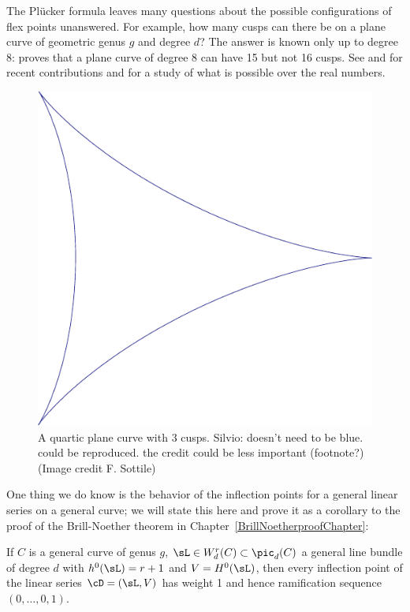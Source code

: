 The Pl\"ucker formula leaves many questions about the possible configurations of flex points unanswered. 
For example, how many cusps can there be on a plane curve of geometric genus $g$ and degree $d$? 
The answer is known only up to degree 8: \cite{Zariski1931} proves that a plane curve of degree 8 can have 15 but not 16 cusps.
See \cite{Calabri} and \cite{Kulikov} for recent contributions and \cite{Kharlamov-Sottile} for a study of what is possible
over the real numbers.

\begin{figure}\label{3-cusp quartic}
\centerline{ \includegraphics[scale=.5]{"main/Fig12-1-threeCusps"}}
 \caption{A quartic plane curve with 3 cusps. {Silvio: doesn't need to be blue.
 could be reproduced. the credit could be less important (footnote?) (Image credit F. Sottile)}}
\end{figure}

One thing we do know is the behavior of the inflection points for a general linear series on a general curve; we will state this here and prove it as a corollary to the proof of the Brill-Noether theorem in Chapter~\ref{BrillNoetherproofChapter}:

\begin{theorem}\label{Brill Noether Plucker}
If $C$ is a general curve of genus $g$, $\sL \in W^r_d(C) \subset \pic_d(C)$ a general line bundle of degree $d$ with $h^0(\sL) = r+1$ and $V = H^0(\sL)$, then every inflection point of the linear series $\cD = (\sL, V)$ has weight 1 and hence ramification sequence $(0, \dots, 0, 1)$.
\end{theorem}


